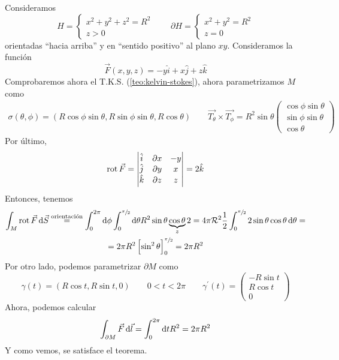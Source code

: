 \begin{example*}
    Consideramos
    \[
        H =
        \begin{cases}
            x^2 + y^2 + z^2 = R^2 \\ z > 0
        \end{cases}
        \qquad
        \partial H  =
        \begin{cases}
            x^2 + y^2 = R^2 \\ z = 0
        \end{cases}
    \]
    orientadas ``hacia arriba'' y en ``sentido positivo'' al plano $xy$. Consideramos la función
    \[
        \vec{F}(x, y, z) = -y \hat{i} + x \hat{j} + z \hat{k}
    \]
    Comprobaremos ahora el T.K.S. (\ref{teo:kelvin-stokes}), ahora parametrizamos $M$ como
    \begin{gather*}
        \sigma\left( \theta, \phi \right) = \left( R\cos\phi\sin\theta, R\sin\phi\sin\theta, R\cos\theta \right)
        \qquad
        \vec{T_\theta} \times \vec{T_\phi} = R^2 \sin\theta
        \begin{pmatrix}
            \cos\phi\sin\theta \\ \sin\phi\sin\theta \\ \cos\theta
        \end{pmatrix}
    \end{gather*}
    Por último, 
    \[
        \operatorname{rot} \vec{F} = \begin{vmatrix}\hat{i} & \partial x & - y \\ \hat{j} & \partial y & x \\ \hat{k} & \partial z & z\end{vmatrix} = 2 \hat{k}
    \]
    Entonces, tenemos
    \begin{gather*}
        \int_M \rot \vec{F} \dif \vec{S} \stackrel{\text{orientación}}{=} \int^{2\pi}_0 \dif \phi \int^{\sfrac{\pi}{2}}_0 \dif \theta R^2 \sin \theta \underbrace{\cos\theta}_
        {z} 2 = 4 \pi \R^2 \frac{1}{2} \int^{\sfrac{\pi}{2}}_0 2 \sin\theta\cos\theta \dif \theta =\\= 2\pi R^2 \left[ \sin^2 \theta \right]^{\sfrac{\pi}{2}}_0 = 2\pi R^2
    \end{gather*}
    Por otro lado, podemos parametrizar $\partial M$ como
    \[
        \gamma(t) = \left( R\cos t, R \sin t, 0 \right) \qquad 0 < t < 2\pi \qquad
        \gamma^\prime (t) =
        \begin{pmatrix}
            -R \sin t \\ R \cos t \\ 0
        \end{pmatrix}
    \]
    Ahora, podemos calcular
    \[
        \int_{\partial M} \vec{F} \dif \vec{l} = \int^{2\pi}_{0} \dif t R^2 = 2 \pi R^2 
    \]
    Y como vemos, se satisface el teorema.
\end{example*}

